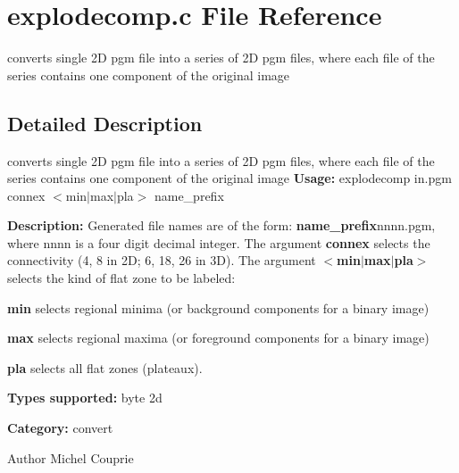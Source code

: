 \section{explodecomp.c File Reference}
\label{explodecomp_8c}


converts single 2D pgm file into a series of 2D pgm files, where each file of the series contains one component of the original image  




\subsection{Detailed Description}
converts single 2D pgm file into a series of 2D pgm files, where each file of the series contains one component of the original image {\bfseries Usage:} explodecomp in.pgm connex $<$min$|$max$|$pla$>$ name\_\-prefix

{\bfseries Description:} Generated file names are of the form: {\bfseries name\_\-prefix}nnnn.pgm, where nnnn is a four digit decimal integer. The argument {\bfseries connex} selects the connectivity (4, 8 in 2D; 6, 18, 26 in 3D). The argument {\bfseries $<$min$|$max$|$pla$>$} selects the kind of flat zone to be labeled: \begin{DoxyItemize}
\item {\bfseries min} selects regional minima (or background components for a binary image) \item {\bfseries max} selects regional maxima (or foreground components for a binary image) \item {\bfseries pla} selects all flat zones (plateaux).\end{DoxyItemize}
{\bfseries Types supported:} byte 2d

{\bfseries Category:} convert

\begin{DoxyAuthor}{Author}
Michel Couprie 
\end{DoxyAuthor}
